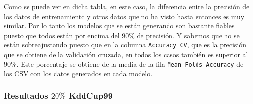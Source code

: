 \documentclass[a4paper, 12pt]{book}
\begin{document}
Como se puede ver en dicha tabla, en este caso, la diferencia entre la precisión de los datos de entrenamiento y otros datos que no ha visto hasta entonces es muy similar. Por lo tanto los modelos que se están generando son bastante fiables puesto que todos están por encima del $90\%$ de precisión. Y sabemos que no se están sobreajustando puesto que en la columna \texttt{Accuracy CV}, que es la precisión que se obtiene de la validación cruzada, en todos los casos también es superior al $90\%$. Este porcentaje se obtiene de la media de la fila \texttt{Mean Folds Accuracy} de los CSV con los datos generados en cada modelo.

\subsubsection{Resultados $20\%$ KddCup99}
\label{subsubsec:kdd_raspberry}
\end{document}
